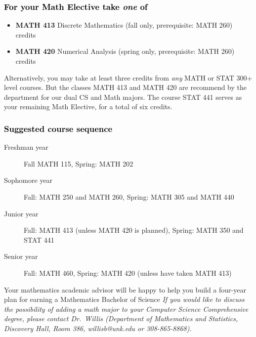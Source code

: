 \documentclass[9pt]{article}
\newenvironment{mypar}[2]
   {\begin{list}{}%
     {\setlength\leftmargin{#1}
     \setlength\rightmargin{#2}}
     \item[]}
   {\end{list}}
\begin{document}
\subsubsection*{\textcolor{black}{For your  Math Elective take \emph{one} of}}
\begin{itemize}
\item \textbf{MATH 413}     Discrete Mathematics  (fall only, prerequisite: MATH 260)   credits
\item \textbf{MATH 420}   Numerical Analysis   (spring only, prerequisite: MATH 260) credits
\end{itemize}
\begin{mypar}{0.5cm}{0.5cm}  Alternatively, you may take at least three credits from \emph{any} MATH or STAT 300+ level courses. But the classes MATH 413 and MATH 420 are recommend by the department for our
dual CS and Math majors.  The course STAT 441 serves as your remaining Math Elective, for a total of six credits. \end{mypar}


\begin{center} \fbox{
  {\textcolor{unkblue}{For a suggested course sequence, see the next page.}}}
\end{center}
\subsubsection*{\textcolor{black}{Suggested course sequence}}

\begin{description}
   \item[\phantom{xxx} Freshman year] Fall MATH 115, Spring: MATH 202
      \item[\phantom{xxx} Sophomore year]  Fall: MATH 250 and MATH 260,   Spring: MATH 305 and MATH 440
     \item[\phantom{xxx} Junior year]  Fall: MATH 413 (unless MATH 420 is planned),  Spring: MATH 350 and STAT 441
      \item[\phantom{xxx} Senior year]  Fall: MATH 460,  Spring: MATH 420 (unless have taken MATH 413)
 \end{description}

\begin{mypar}{0.5cm}{0.5cm}  Your mathematics academic advisor will be happy to help you build a four-year plan for earning a Mathematics Bachelor of Science  \textcolor{unkblue}{\emph{If you would like to discuss the possibility of  adding a math major to your Computer Science Comprehensive degree, please contact \mbox{Dr.\ Willis} (Department of Mathematics and Statistics,  Discovery Hall, Room 386, willisb@unk.edu or 308-865-8868).}}
\end{mypar}
\end{document}
